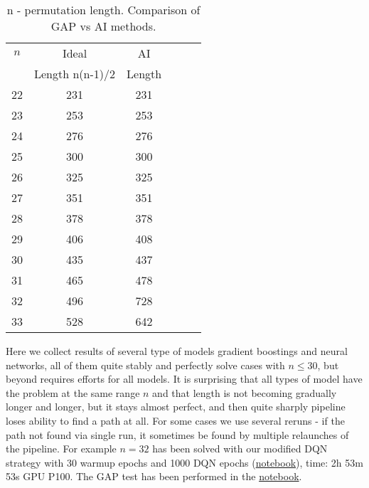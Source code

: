 \documentclass[atmp]{ipart_v1}
\numberwithin{equation}{section}
\theoremstyle{plain}%
\begin{document}
\begin{table}[h]
    \centering
    \begin{tabular}{|c|c|c|c|c|c|}
        \hline
        $n$  &   Ideal            &   AI      \\
             &   Length n(n-1)/2  & Length    \\
        \hline
        22    &       231           & 231   \\
        \hline
        23    &       253           & 253   \\
        \hline
        24    &      276            & 276   \\
        \hline
        25    &    300              & 300   \\
        \hline
        26    &     325             & 325   \\
        \hline
        27    &     351             & 351   \\
        \hline
        28    &     378             & 378   \\
        \hline
        29    &   406               & 408   \\
        \hline
        30    &     435             & 437   \\
        \hline
        31    &    465              & 478   \\
        \hline
        32    &    496              & 728   \\
        \hline
        33    &    528              & 642   \\
        \hline           
    \end{tabular}
    \captionsetup{skip=10pt} 
    \caption{n - permutation length. Comparison of GAP vs AI methods.   }
    \label{tab:example_nn}
\end{table}

Here we collect results of several type of models gradient boostings and neural networks, all of them quite stably and perfectly solve cases with  $n\le 30$, but beyond requires efforts for all models.%
It is surprising that all types of model have the problem at the same range $n$ and that length is not becoming gradually longer and longer, but  it  stays almost perfect, and then  quite sharply pipeline loses ability to find a path at all. For some cases  we use several reruns - if the path not found via single run, it sometimes be found by multiple relaunches of the pipeline. 
For example $n=32$ has been solved with our modified DQN strategy with 30 warmup epochs and 1000 DQN epochs (\href{https://www.kaggle.com/code/rustemturtayev/lrx-cayleypy-rl-mdqn-d44272?scriptVersionId=223961901}{notebook}), time: 2h 53m 53s GPU P100. The GAP test has been performed in the \href{https://www.kaggle.com/code/avm888/group-elements-decomposition-gap-limits}{notebook}. 
\end{document}
